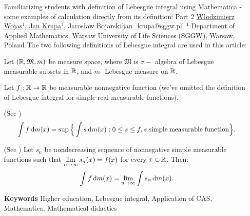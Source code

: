 \begin{abstract_online}{Familiarizing students with definition of Lebesgue integral  using Mathematica - some examples of calculation directly from its definition: Part 2}{%
        \underline{W{\l}odzimierz Wojas}$^{1}$, \underline{Jan Krupa}$^{1}$,  Jaros{\l}aw Bojarski}{[jan\_krupa@sggw.pl]
        }{%
        $^1$ Department of Applied Mathematics, Warsaw University of Life Sciences (SGGW), Warsaw, Poland}
 The two following definitions of Lebesgue integral are used in this article:

Let $(\mathbb{R}, \mathfrak{M}, m)$ be measure space, where
$\mathfrak{M}$ is $\sigma-$ algebra of Lebesgue measurable subsets
in $\mathbb{R}$, and $m$- Lebesgue measure on  $\mathbb{R}$.

Let $f:\mathbb{R} \to \mathbb{R}$ be measurable nonnegative function (we've  omitted the definition of Lebesgue integral for simple real measurable functions).

\begin{defin} (See \cite{Rudin, Bartle, Jones, Browder, Folland})
\label{def:1}
\begin{equation}
\label{eq:1}
\int f\,\mathrm{d} m(x) = \sup \Big\{ \int s\,\mathrm{d} m(x): 0\leq s \leq f, s\; \mathrm{simple\;measurable\; function}\Big\}.
\end{equation}
\end{defin}

\begin{defin} (See \cite{Char, Kol, Sik})
\label{def:2}
Let $s_n$ be nondecreasing sequence of nonnegative simple measurable functions such that $\displaystyle \lim_{n\to \infty}s_n (x)=f(x)$ for every $x\in \mathbb{R}$.
Then:
\begin{equation}
\label{eq:2}
\int f\,\mathrm{d} m(x) = \lim_{n\to \infty}\int s_n \,\mathrm{d} m(x).
\end{equation}
\end{defin}

\textbf{Keywords} \newline{}Higher education, Lebesgue integral, Application of CAS, Mathematica, Mathematical didactics


\end{abstract_online}
